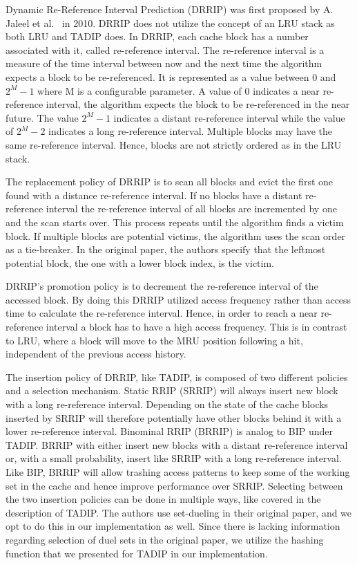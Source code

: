 Dynamic Re-Reference Interval Prediction (DRRIP) was first proposed by A. Jaleel et al.~\cite{Jaleel2010} in 2010.
DRRIP does not utilize the concept of an LRU stack as both LRU and TADIP does.
In DRRIP, each cache block has a number associated with it, called re-reference interval.
The re-reference interval is a measure of the time interval between now and the next time the algorithm expects a block to be re-referenced.
It is represented as a value between 0 and $2^M - 1$ where M is a configurable parameter.
A value of 0 indicates a near re-reference interval, the algorithm expects the block to be re-referenced in the near future.
The value $2^M - 1$ indicates a distant re-reference interval while the value of $2^M - 2$ indicates a long re-reference interval.
Multiple blocks may have the same re-reference interval. 
Hence, blocks are not strictly ordered as in the LRU stack.

The replacement policy of DRRIP is to scan all blocks and evict the first one found with a distance re-reference interval.
If no blocks have a distant re-reference interval the re-reference interval of all blocks are incremented by one and the scan starts over.
This process repeats until the algorithm finds a victim block.
If multiple blocks are potential victims, the algorithm uses the scan order as a tie-breaker.
In the original paper, the authors specify that the leftmost potential block, the one with a lower block index, is the victim.

DRRIP's promotion policy is to decrement the re-reference interval of the accessed block.
By doing this DRRIP utilized access frequency rather than access time to calculate the re-reference interval.
Hence, in order to reach a near re-reference interval a block has to have a high access frequency.
This is in contrast to LRU, where a block will move to the MRU position following a hit, independent of the previous access history.

The insertion policy of DRRIP, like TADIP, is composed of two different policies and a selection mechanism.
Static RRIP (SRRIP) will always insert new block with a long re-reference interval. 
Depending on the state of the cache blocks inserted by SRRIP will therefore potentially have other blocks behind it with a lower re-reference interval.
Binominal RRIP (BRRIP) is analog to BIP under TADIP.
BRRIP with either insert new blocks with a distant re-reference interval or, with a small probability, insert like SRRIP with a long re-reference interval.
Like BIP, BRRIP will allow trashing access patterns to keep some of the working set in the cache and hence improve performance over SRRIP.
Selecting between the two insertion policies can be done in multiple ways, like covered in the description of TADIP.
The authors use set-dueling in their original paper, and we opt to do this in our implementation as well.
Since there is lacking information regarding selection of duel sets in the original paper, we utilize the hashing function that we presented for TADIP in our implementation.

